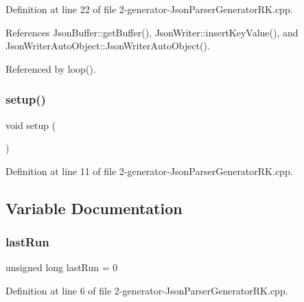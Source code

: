Definition at line 22 of file 2-\/generator-\/\+Json\+Parser\+Generator\+R\+K.\+cpp.



References Json\+Buffer\+::get\+Buffer(), Json\+Writer\+::insert\+Key\+Value(), and Json\+Writer\+Auto\+Object\+::\+Json\+Writer\+Auto\+Object().



Referenced by loop().

\mbox{\label{2-generator-_json_parser_generator_r_k_8cpp_a4fc01d736fe50cf5b977f755b675f11d}} 
\subsubsection{\texorpdfstring{setup()}{setup()}}
{\footnotesize\ttfamily void setup (\begin{DoxyParamCaption}{ }\end{DoxyParamCaption})}



Definition at line 11 of file 2-\/generator-\/\+Json\+Parser\+Generator\+R\+K.\+cpp.



\subsection{Variable Documentation}
\mbox{\label{2-generator-_json_parser_generator_r_k_8cpp_a5082951a06f690a0623ea99ed4228392}} 
\subsubsection{\texorpdfstring{last\+Run}{lastRun}}
{\footnotesize\ttfamily unsigned long last\+Run = 0}



Definition at line 6 of file 2-\/generator-\/\+Json\+Parser\+Generator\+R\+K.\+cpp.

